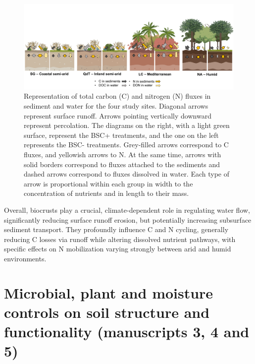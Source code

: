 \begin{figure}[h!]
	\centering
	\includegraphics[width=1\textwidth]{img/nutrient-flow-diagram.png}
	\caption[Conceptual diagram of total carbon (C) and nitrogen (N) fluxes in sediment and water for the four study sites]{Representation of total carbon (C) and nitrogen (N) fluxes in sediment and water for the four study sites. Diagonal arrows represent surface runoff. Arrows pointing vertically downward represent percolation. The diagrams on the right, with a light green surface, represent the BSC+ treatments, and the one on the left represents the BSC- treatments. Grey-filled arrows correspond to C fluxes, and yellowish arrows to N. At the same time, arrows with solid borders correspond to fluxes attached to the sediments and dashed arrows correspond to fluxes dissolved in water. Each type of arrow is proportional within each group in width to the concentration of nutrients and in length to their mass.}
	\label{fig:nutrient-flow}
\end{figure}

\FloatBarrier

Overall, biocrusts play a crucial, climate-dependent role in regulating water flow, significantly reducing surface runoff erosion, but potentially increasing subsurface sediment transport. They profoundly influence C and N cycling, generally reducing C losses via runoff while altering dissolved nutrient pathways, with specific effects on N mobilization varying strongly between arid and humid environments.

\section[Microbial, plant and moisture controls on soil structure and functionality]{Microbial, plant and moisture controls on soil structure and functionality (manuscripts 3, 4 and 5)}
\label{sec:MicrobesPlantsMoistureStructure}

